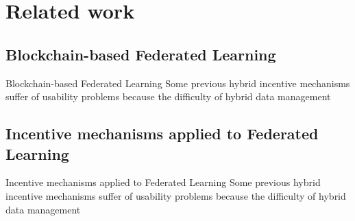 

\section{Related work}

\subsection{Blockchain-based Federated Learning}

\begin{frame}{Blockchain-based Federated Learning}
     Some previous hybrid incentive mechanisms\cite{paper52} suffer of usability problems because the difficulty of hybrid data management
\end{frame}

\subsection{Incentive mechanisms applied to Federated Learning}

\begin{frame}{Incentive mechanisms applied to Federated Learning}
     Some previous hybrid incentive mechanisms\cite{paper52} suffer of usability problems because the difficulty of hybrid data management
\end{frame}
